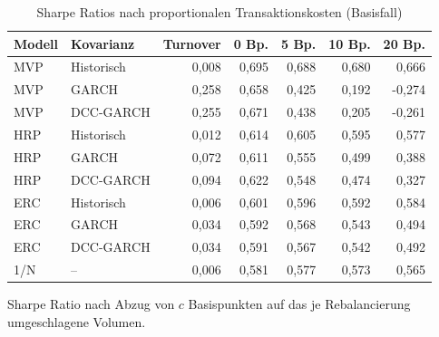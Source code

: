 \begin{table}[htbp]
  \centering
  \footnotesize
  \begin{tabular}{llrrrrr}
    \toprule
    Modell & Kovarianz & Turnover & 0 Bp. & 5 Bp. & 10 Bp. & 20 Bp. \\
    \midrule
    MVP & Historisch & 0,008 & 0,695 & 0,688 & 0,680 & 0,666 \\
    MVP & GARCH & 0,258 & 0,658 & 0,425 & 0,192 & -0,274 \\
    MVP & DCC-GARCH & 0,255 & 0,671 & 0,438 & 0,205 & -0,261 \\
    \midrule
    HRP & Historisch & 0,012 & 0,614 & 0,605 & 0,595 & 0,577 \\
    HRP & GARCH & 0,072 & 0,611 & 0,555 & 0,499 & 0,388 \\
    HRP & DCC-GARCH & 0,094 & 0,622 & 0,548 & 0,474 & 0,327 \\
    \midrule
    ERC & Historisch & 0,006 & 0,601 & 0,596 & 0,592 & 0,584 \\
    ERC & GARCH & 0,034 & 0,592 & 0,568 & 0,543 & 0,494 \\
    ERC & DCC-GARCH & 0,034 & 0,591 & 0,567 & 0,542 & 0,492 \\
    \midrule
    1/N & -- & 0,006 & 0,581 & 0,577 & 0,573 & 0,565 \\
    \bottomrule
  \end{tabular}
  \caption{Sharpe Ratios nach proportionalen Transaktionskosten (Basisfall)}
  \label{tab:transaktionskosten}
  \begin{minipage}{\linewidth}\vspace{0.4em}\centering\footnotesize
  Sharpe Ratio nach Abzug von $c$ Basispunkten auf das je Rebalancierung umgeschlagene Volumen.
  \end{minipage}
\end{table}
